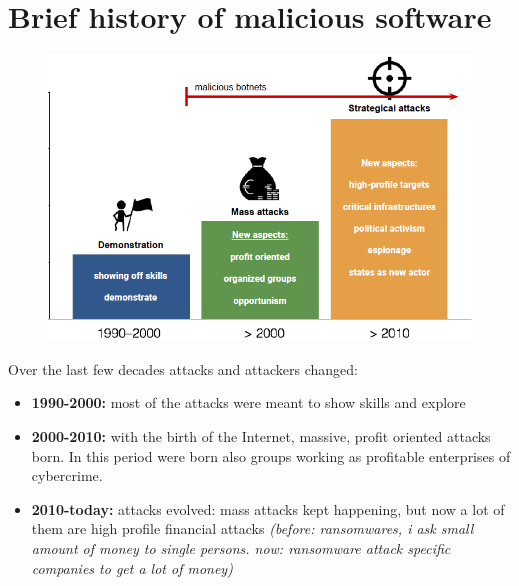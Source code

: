     \section{Brief history of malicious software}
        \begin{figure}[ht!]
            \centering
            \includegraphics[width=0.7\linewidth]{malicious.png}
        \end{figure}
        Over the last few decades attacks and attackers changed:
        \begin{itemize}
            \item \textbf{1990-2000:} most of the attacks were meant to show skills and explore
            \item \textbf{2000-2010:} with the birth of the Internet, massive, profit oriented attacks born. In this period were born also groups working as profitable enterprises of cybercrime.
            \item \textbf{2010-today:} attacks evolved: mass attacks kept happening, but now a lot of them are high profile financial attacks \textit{(before: ransomwares, i ask small amount of money to single persons. now: ransomware attack specific companies to get a lot of money)} 
        \end{itemize}
\newpage

